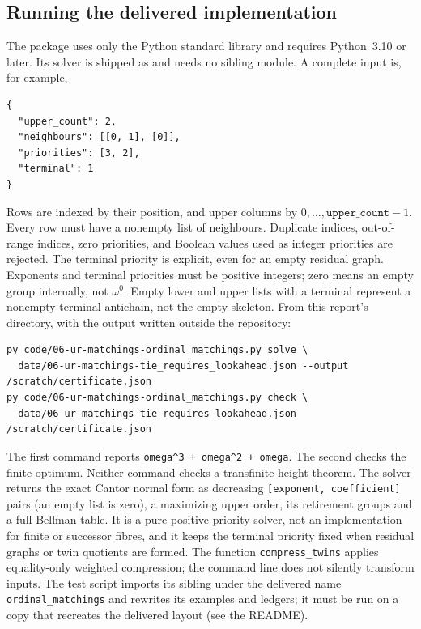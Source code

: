 \documentclass[11pt,a4paper]{article}
\theoremstyle{definition}
\theoremstyle{remark}
\begin{document}
\subsection{Running the delivered implementation}\label{nh:ur:sec:running}
The package uses only the Python standard library and requires Python~3.10 or
later. Its solver is shipped as
 and needs no sibling module.
A complete input is, for example,
\begin{lstlisting}
{
  "upper_count": 2,
  "neighbours": [[0, 1], [0]],
  "priorities": [3, 2],
  "terminal": 1
}
\end{lstlisting}
Rows are indexed by their position, and upper columns by
$0,\ldots,\texttt{upper\_count}-1$. Every row must have a nonempty list of
neighbours. Duplicate indices, out-of-range indices, zero priorities, and
Boolean values used as integer priorities are rejected. The terminal priority
is explicit, even for an empty residual graph. Exponents and terminal
priorities must be positive integers; zero means an empty group internally,
not $\omega^0$. Empty lower and upper lists with a terminal represent a
nonempty terminal antichain, not the empty skeleton. From this report's
directory, with the output written outside the repository:
\begin{lstlisting}
py code/06-ur-matchings-ordinal_matchings.py solve \
  data/06-ur-matchings-tie_requires_lookahead.json --output /scratch/certificate.json
py code/06-ur-matchings-ordinal_matchings.py check \
  data/06-ur-matchings-tie_requires_lookahead.json /scratch/certificate.json
\end{lstlisting}
The first command reports \texttt{omega\^{}3 + omega\^{}2 + omega}. The
second checks the finite optimum. Neither command checks a transfinite height
theorem. The solver returns the exact Cantor normal form as decreasing
\texttt{[exponent, coefficient]} pairs (an empty list is zero), a maximizing
upper order, its retirement groups and a full Bellman table. It is a
pure-positive-priority solver, not an implementation for finite or successor
fibres, and it keeps the terminal priority fixed when residual graphs or twin
quotients are formed. The function \texttt{compress\_twins} applies
equality-only weighted compression; the command line does not silently
transform inputs. The test script 
imports its sibling under the delivered name \texttt{ordinal\_matchings} and
rewrites its examples and ledgers; it must be run on a copy that recreates the
delivered layout (see the README).
\end{document}

